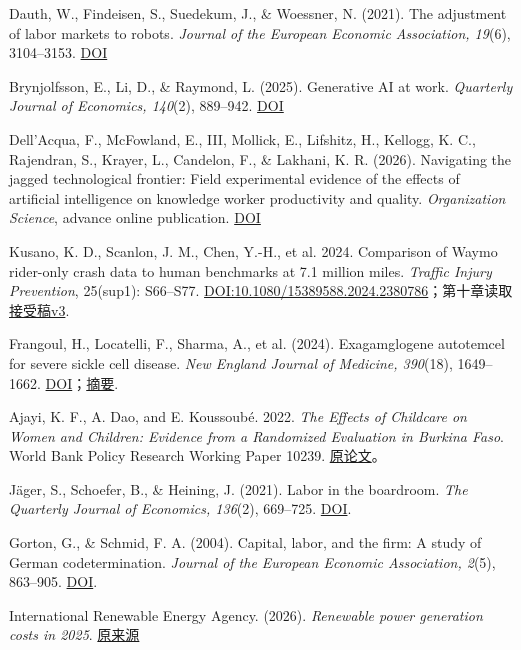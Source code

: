 \documentclass[UTF8,fontset=windows,12pt,a4paper,oneside,openany]{ctexbook}
\begin{document}
Dauth, W., Findeisen, S., Suedekum, J., \& Woessner, N. (2021). The adjustment of labor markets to robots. \emph{Journal of the European Economic Association, 19}(6), 3104–3153. \href{https://doi.org/10.1093/jeea/jvab012}{DOI}

Brynjolfsson, E., Li, D., \& Raymond, L. (2025). Generative AI at work. \emph{Quarterly Journal of Economics, 140}(2), 889–942. \href{https://doi.org/10.1093/qje/qjae044}{DOI}

Dell’Acqua, F., McFowland, E., III, Mollick, E., Lifshitz, H., Kellogg, K. C., Rajendran, S., Krayer, L., Candelon, F., \& Lakhani, K. R. (2026). Navigating the jagged technological frontier: Field experimental evidence of the effects of artificial intelligence on knowledge worker productivity and quality. \emph{Organization Science}, advance online publication. \href{https://doi.org/10.1287/orsc.2025.21838}{DOI}

Kusano, K. D., Scanlon, J. M., Chen, Y.-H., et al. 2024. Comparison of Waymo rider-only crash data to human benchmarks at 7.1 million miles. \emph{Traffic Injury Prevention}, 25(sup1): S66–S77. \href{https://doi.org/10.1080/15389588.2024.2380786}{DOI:10.1080/15389588.2024.2380786}；第十章读取\href{https://arxiv.org/html/2312.12675v3}{接受稿v3}.

Frangoul, H., Locatelli, F., Sharma, A., et al. (2024). Exagamglogene autotemcel for severe sickle cell disease. \emph{New England Journal of Medicine, 390}(18), 1649–1662. \href{https://doi.org/10.1056/NEJMoa2309676}{DOI}；\href{https://pubmed.ncbi.nlm.nih.gov/38661449/}{摘要}.

Ajayi, K. F., A. Dao, and E. Koussoubé. 2022. \emph{The Effects of Childcare on Women and Children: Evidence from a Randomized Evaluation in Burkina Faso}. World Bank Policy Research Working Paper 10239. \href{https://documents1.worldbank.org/curated/en/099215111282254210/pdf/IDU09ee54b690865904f71089a60d76ad621601c.pdf}{原论文}。

Jäger, S., Schoefer, B., \& Heining, J. (2021). Labor in the boardroom. \emph{The Quarterly Journal of Economics, 136}(2), 669–725. \href{https://doi.org/10.1093/qje/qjaa038}{DOI}.

Gorton, G., \& Schmid, F. A. (2004). Capital, labor, and the firm: A study of German codetermination. \emph{Journal of the European Economic Association, 2}(5), 863–905. \href{https://doi.org/10.1162/1542476042782260}{DOI}.

International Renewable Energy Agency. (2026). \emph{Renewable power generation costs in 2025}. \href{https://www.irena.org/Publications/2026/Jul/Renewable-Power-Generation-Costs-in-2025}{原来源}
\end{document}
